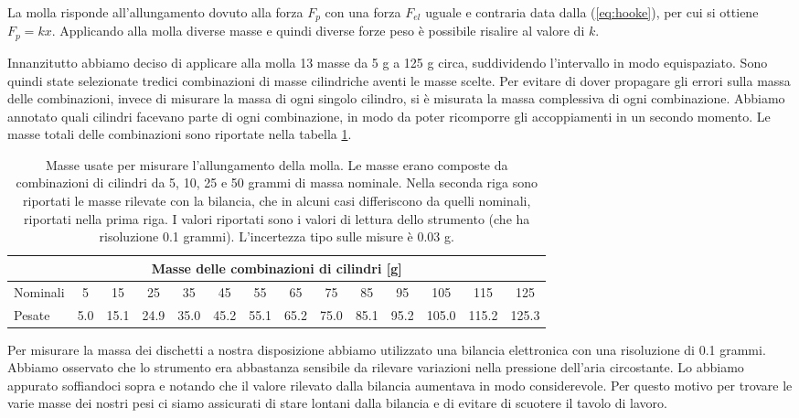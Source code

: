 La molla risponde all'allungamento dovuto alla forza $F_p$ con una forza $F_{el}$ uguale e contraria
data dalla (\ref{eq:hooke}),
per cui si ottiene $F_p = kx$. Applicando alla molla diverse masse e quindi diverse forze peso è possibile risalire al valore di $k$.

Innanzitutto abbiamo deciso di applicare alla molla 13 masse da 5 g a 125 g circa, suddividendo l'intervallo in modo equispaziato.
Sono quindi state selezionate tredici combinazioni di masse cilindriche aventi le masse scelte.
Per evitare di dover propagare gli errori sulla massa delle combinazioni, invece di misurare la massa di ogni singolo cilindro,
si è misurata la massa complessiva di ogni combinazione.
Abbiamo annotato quali cilindri facevano parte di ogni combinazione, in modo da poter ricomporre gli accoppiamenti in un secondo momento. Le masse totali delle combinazioni sono riportate nella tabella \ref{tab:masse}.

\begin{table}[tb]
    \centering
    \small
    \begin{tabular}{l | c c c c c c c c c c c c c}
        \multicolumn{14}{c}{\textbf{Masse delle combinazioni di cilindri [g]}} \\[1mm]
        \toprule
        Nominali & 5 & 15 & 25 & 35 & 45 & 55 & 65 & 75 & 85 & 95 & 105 & 115 & 125 \\
        Pesate & 5.0 & 15.1 & 24.9 & 35.0 & 45.2 & 55.1 & 65.2 & 75.0 & 85.1 & 95.2 & 105.0 & 115.2 & 125.3 \\
        \bottomrule
    \end{tabular}
    \caption{Masse usate per misurare l'allungamento della molla. Le masse erano composte da combinazioni
    di cilindri da 5, 10, 25 e 50 grammi di massa nominale. Nella seconda riga sono riportati le masse
    rilevate con la bilancia, che in alcuni casi differiscono da quelli nominali, riportati nella prima riga.
    I valori riportati sono i valori di lettura dello strumento (che ha risoluzione 0.1 grammi). L'incertezza tipo sulle misure
    è 0.03 g.}
    \label{tab:masse}
\end{table}

Per misurare la massa dei dischetti a nostra disposizione abbiamo utilizzato una bilancia elettronica con una risoluzione di 0.1 grammi. Abbiamo osservato che lo strumento era abbastanza sensibile da rilevare variazioni nella pressione dell'aria circostante. Lo abbiamo appurato soffiandoci sopra e notando che il valore rilevato dalla bilancia aumentava in modo considerevole. Per questo motivo per trovare le varie masse dei nostri pesi ci siamo assicurati di stare lontani dalla bilancia e di evitare di scuotere il tavolo di lavoro.

